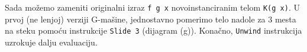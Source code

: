 Sada možemo zameniti originalni izraz \verb|f g x| novoinstanciranim telom \verb|K(g x)|. U prvoj (ne lenjoj) verziji G-mašine, jednostavno pomerimo telo nadole za 3 mesta na steku pomoću instrukcije \verb|Slide 3| (dijagram (g)). Konačno, \verb|Unwind| instrukcija uzrokuje dalju evaluaciju.

